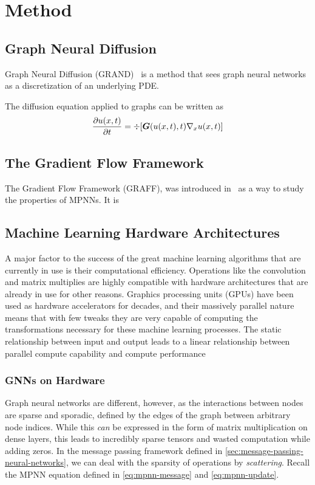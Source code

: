 \documentclass[../main.tex]{subfiles}
\begin{document}
    \chapter{Method}\label{ch:method}

    \section{Graph Neural Diffusion}\label{sec:graph-neural-diffusion}
    Graph Neural Diffusion (GRAND)~\cite{chamberlainGRANDGraphNeural2021} is a method that sees graph neural networks as a discretization of an underlying PDE\@.

    The diffusion equation applied to graphs can be written as
    \begin{equation}
        \frac{\partial u(x, t)}{\partial t} = \div [\bm G(u(x, t), t)\nabla_x u(x, t)]\label{eq:graph-diffusion}
    \end{equation}

    \section{The Gradient Flow Framework}\label{sec:the-gradient-flow-framework}
    The Gradient Flow Framework (GRAFF), was introduced in~\cite{digiovanniGraphNeuralNetworks2022} as a way to study the properties of MPNNs.
    It is

    \section{Machine Learning Hardware Architectures}\label{sec:machine-learning-hardware-architectures}
    A major factor to the success of the great machine learning algorithms that are currently in use is their computational efficiency.
    Operations like the convolution and matrix multiplies are highly compatible with hardware architectures that are already in use for other reasons.
    Graphics processing units (GPUs) have been used as hardware accelerators for decades, and their massively parallel nature means that with few tweaks they are very capable of computing the transformations necessary for these machine learning processes.
    The static relationship between input and output leads to a linear relationship between parallel compute capability and compute performance

    \subsection{GNNs on Hardware}\label{subsec:gnns-on-hardware}
    Graph neural networks are different, however, as the interactions between nodes are sparse and sporadic, defined by the edges of the graph between arbitrary node indices.
    While this \textit{can} be expressed in the form of matrix multiplication on dense layers, this leads to incredibly sparse tensors and wasted computation while adding zeros.
    In the message passing framework defined in \autoref{sec:message-passing-neural-networks}, we can deal with the sparsity of operations by \textit{scattering}.
    Recall the MPNN equation defined in \autoref{eq:mpnn-message} and \autoref{eq:mpnn-update}.
\end{document}

